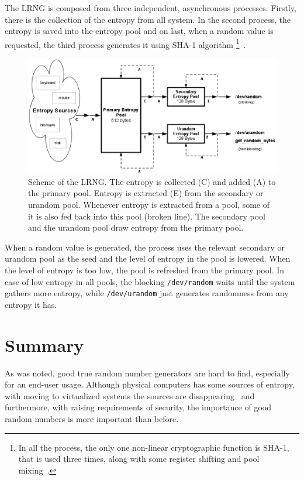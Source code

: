 \par{
The LRNG is composed from three independent, asynchronous processes. 
Firstly, there is the collection of the entropy from all system. In the second 
process, the entropy is saved into the entropy pool and on last, when a random 
value is requested, the third process generates it using SHA-1 algorithm
\footnote{In all the process, the only one non-linear cryptographic function 
is SHA-1, that is used three times, along with some register shifting and pool 
mixing~\cite[section~2.6]{AnalysisOfLinuxRNG}.}~\cite[chapter~2]{AnalysisOfLinuxRNG}.
}

\begin{figure}[h!]
  \centering
 \includegraphics[width=16cm,keepaspectratio]{fig/LRNG} %
\caption{Scheme of the LRNG. The entropy is collected (C) and added (A) 
to the primary pool. Entropy is extracted (E) from the secondary or urandom 
pool. Whenever entropy is extracted from a pool, some of it is also fed back 
into this pool (broken line). The secondary pool and the urandom pool draw 
entropy from the primary pool.~\cite{AnalysisOfLinuxRNG}}
\label{fig:LRNG}
\end{figure}

\par{
When a random value is generated, the process uses the relevant secondary 
or urandom pool as the seed and the level of entropy in the pool is lowered. 
When the level of entropy is too low, the pool is refreshed from the primary pool. 
In case of low entropy in all pools, the blocking {\tt /dev/random} waits until the 
system gathers more entropy, while {\tt /dev/urandom} just generates 
randomness from any entropy it has.
}


\section{Summary}
\par{
As was noted, good true random number generators are hard to find, especially 
for an end-user usage. Although physical computers has some sources 
of entropy, with moving to virtualized systems the sources are 
disappearing~\cite{AnalysisOfEntropyLevels} and furthermore, with raising 
requirements of security, the importance of good random numbers is more 
important than before.
}

